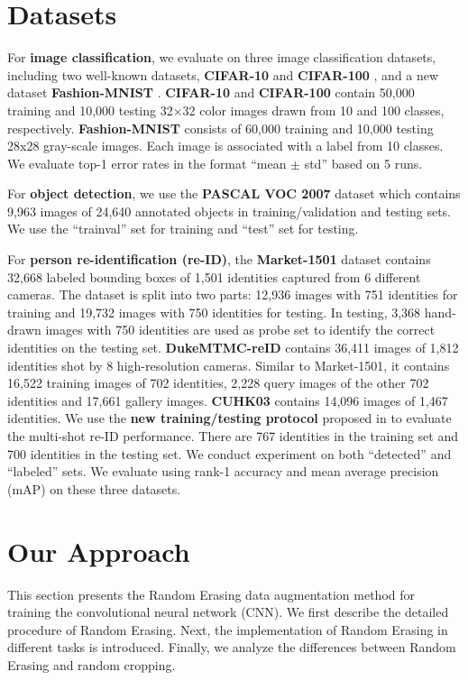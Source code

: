 \documentclass[10pt,twocolumn,letterpaper]{article}
\begin{document}
\section{Datasets}
For \textbf{image classification}, we evaluate on three image classification datasets, including two well-known datasets, \textbf{CIFAR-10} and \textbf{CIFAR-100} \cite{cifar}, and a new dataset  \textbf{Fashion-MNIST} \cite{xiao2017fashion}. \textbf{CIFAR-10} and \textbf{CIFAR-100} contain 50,000 training and 10,000 testing 32$\times$32 color images drawn from 10 and 100 classes, respectively. \textbf{Fashion-MNIST} consists of 60,000 training and 10,000 testing 28x28 gray-scale images. Each image is associated with a label from 10 classes. We evaluate top-1 error rates in the format ``mean $\pm$ std'' based on 5 runs.

For \textbf{object detection}, we use the \textbf{PASCAL VOC 2007} \cite{everingham2010pascal} dataset which contains 9,963 images of 24,640 annotated objects in training/validation and testing sets. We use the ``trainval'' set for training and ``test'' set for testing.  %

For \textbf{person re-identification (re-ID)}, the \textbf{Market-1501} dataset \cite{zheng2015scalable} contains 32,668 labeled bounding boxes of 1,501 identities captured from 6 different cameras.  The dataset is split into two parts: 12,936 images with 751 identities for training and 19,732 images with 750 identities for testing. In testing, 3,368 hand-drawn images with 750 identities are used as probe set to identify the correct identities on the testing set. \textbf{DukeMTMC-reID} \cite{zheng2017unlabeled,ristani2016MTMC} contains 36,411 images of 1,812 identities shot by 8 high-resolution cameras. Similar to Market-1501, it contains 16,522 training images of 702 identities, 2,228 query images of the other 702 identities and 17,661 gallery images. \textbf{CUHK03} \cite{CUHK03} contains 14,096 images of 1,467 identities. We use the \textbf{new training/testing protocol} proposed in  \cite{zhong2017re} to evaluate the multi-shot re-ID performance. There are 767 identities in the training set and 700 identities in the testing set. We conduct experiment on both ``detected'' and ``labeled'' sets. We evaluate using rank-1 accuracy and mean average precision (mAP) on these three datasets.


\section{Our Approach}
       This section presents the Random Erasing data augmentation method for training the convolutional neural network (CNN). We first describe the detailed procedure of Random Erasing. Next, the implementation of Random Erasing in different tasks is introduced. Finally, we analyze the differences between Random Erasing and random cropping.
       
\end{document}
